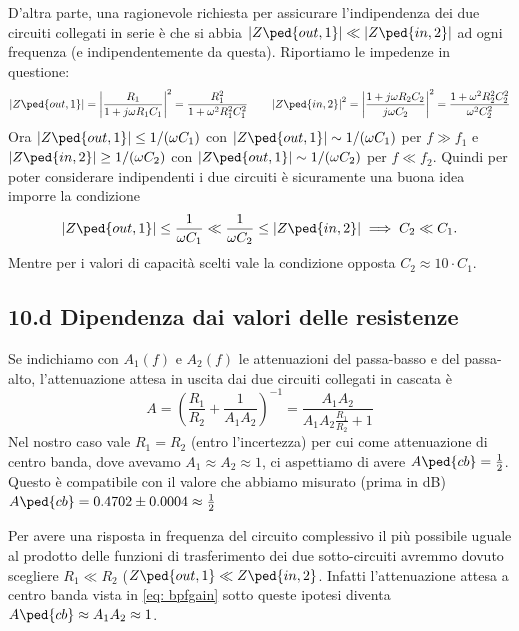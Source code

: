 \documentclass[10pt, a4paper, italian]{article}
\begin{document}
D'altra parte, una ragionevole richiesta per assicurare l'indipendenza dei due
circuiti collegati in serie è che si abbia
$\abs{Z\ped{out, 1}} \ll \abs{Z\ped{in,2}}$ ad ogni frequenza (e 
indipendentemente da questa). Riportiamo le impedenze in questione:
\[
\abs{Z\ped{out, 1}} = \abs{\frac{R_1}{1 + j \omega R_1 C_1}}^2 = 
\frac{R_1^2}{1 + \omega^2 R_1^2 C_1^2}
\qquad
\abs{Z\ped{in, 2}}^2 = \abs{\frac{1 + j \omega R_2 C_2}{j\omega 
C_2}}^2 = \frac{1 + \omega^2 R_2^2 C_2^2}{\omega^2 C_2^2}
\]
Ora $\abs{Z\ped{out, 1}} \leq 1/(\omega C_1)$ con $\abs{Z\ped{out, 
1}} \sim 1/(\omega C_1)$ per $f \gg f_1 $ e $\abs{Z\ped{in, 2}} 
\geq 1/(\omega C_2)$ con $\abs{Z\ped{out, 1}} \sim 1/(\omega C_2) 
$ per $ f \ll f_2 $. Quindi per poter considerare indipendenti i due circuiti
è sicuramente una buona idea imporre la condizione
\[
\abs{Z\ped{out, 1}} \leq \frac{1}{\omega C_1} \ll \frac{1}{\omega C_2} \leq 
\abs{Z\ped{in, 2}} \implies C_2 \ll C_1.
\]
Mentre per i valori di capacità scelti vale la condizione opposta
$C_2 \approx 10 \cdot C_1$.

\subsection*{10.d Dipendenza dai valori delle resistenze}
Se indichiamo con $A_1(f)$ e $A_2(f)$ le attenuazioni del passa-basso e del
passa-alto, l'attenuazione attesa in uscita dai due circuiti collegati in
cascata è
\begin{equation}\label{eq: bpfgain}
A = \left(\frac{R_1}{R_2} + \frac{1}{A_1 A_2}\right)^{-1} = 
\frac{A_1 A_2}{A_1 A_2 \frac{R_1}{R_2} + 1} 
\end{equation}
Nel nostro caso vale $R_1 = R_2$ (entro l'incertezza) per cui come
attenuazione di centro banda, dove avevamo $A_1 \approx A_2 \approx 1$, ci
aspettiamo di avere $A\ped{cb} = \frac{1}{2}$.
Questo è compatibile con il valore che abbiamo misurato (prima in dB)
$A\ped{cb} = 0.4702 \pm 0.0004 \approx \frac{1}{2}$

Per avere una risposta in frequenza del circuito complessivo il più possibile
uguale al prodotto delle funzioni di trasferimento dei due sotto-circuiti
avremmo dovuto scegliere $R_1 \ll R_2$ ($Z\ped{out, 1} \ll Z\ped{in, 2}$.
Infatti l'attenuazione attesa a centro banda vista in \eqref{eq: bpfgain}
sotto queste ipotesi diventa $A\ped{cb} \approx A_1 A_2 \approx 1$.
\end{document}
